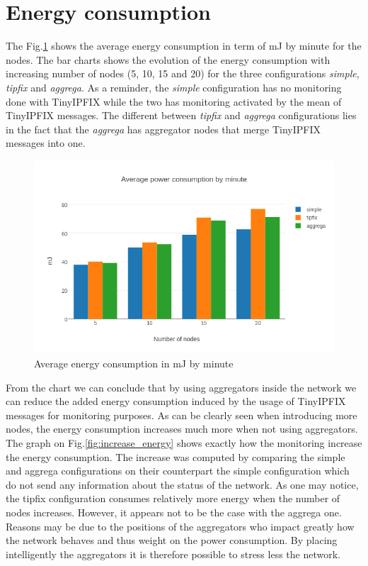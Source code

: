 \section*{Energy consumption}

The Fig.\ref{fig:average_energy} shows the average energy consumption in term of mJ by minute for the nodes. The bar charts shows the evolution of the energy consumption with increasing number of nodes (5, 10, 15 and 20) for the three configurations \textit{simple}, \textit{tipfix} and \textit{aggrega}. As a reminder, the \textit{simple} configuration has no monitoring done with TinyIPFIX while the two has monitoring activated by the mean of TinyIPFIX messages. The different between \textit{tipfix} and \textit{aggrega} configurations lies in the fact that the \textit{aggrega} has aggregator nodes that merge TinyIPFIX messages into one. \\

\begin{figure}[h]
  \centering
  \includegraphics[width=\textwidth]{res/average_energy.png}
  \caption{Average energy consumption in mJ by minute}
  \label{fig:average_energy}
\end{figure}

From the chart we can conclude that by using aggregators inside the network we can reduce the added energy consumption induced by the usage of TinyIPFIX messages for monitoring purposes. As can be clearly seen when introducing more nodes, the energy consumption increases much more when not using aggregators. The graph on Fig.\ref{fig:increase_energy} shows exactly how the monitoring increase the energy consumption. The increase was computed by comparing the simple and aggrega configurations on their counterpart the simple configuration which do not send any information about the status of the network. As one may notice, the tipfix configuration consumes  relatively more energy when the number of nodes increases. However, it appears not to be the case with the aggrega one. Reasons may be due to the positions of the aggregators who impact greatly how the network behaves and thus weight on the power consumption. By placing intelligently the aggregators it is therefore possible to stress less the network.\\

